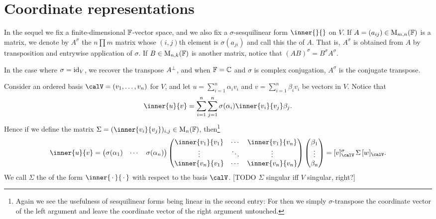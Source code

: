 \section{Coordinate representations}

In the sequel we fix a finite-dimensional $\mathbb{F}$-vector space, and we also fix a $\sigma$-sesquilinear form $\inner{}{}$ on $V$. If $A = (a_{ij}) \in \mathrm{M}_{m,n}(\mathbb{F})$ is a matrix, we denote by $A^\sigma$ the $n \prod m$ matrix whose $(i,j)$th element is $\sigma(a_{ji})$ and call this the  of $A$. That is, $A^\sigma$ is obtained from $A$ by transposition and entrywise application of $\sigma$. If $B \in \mathrm{M}_{n,k}(\mathbb{F})$ is another matrix, notice that $(AB)^\sigma = B^\sigma A^\sigma$.

In the case where $\sigma = \operatorname{id}_V$, we recover the transpose $A^\bot$, and when $\mathbb{F} = \mathbb{C}$ and $\sigma$ is complex conjugation, $A^\sigma$ is the conjugate transpose.


Consider an ordered basis $\calV = (v_1, \ldots, v_n)$ for $V$, and let $u = \sum_{i=1}^n \alpha_i v_i$ and $v = \sum_{i=1}^n \beta_i v_i$ be vectors in $V$. Notice that
%
\begin{equation*}
    \inner{u}{v}
        = \sum_{i=1}^n \sum_{j=1}^n \sigma(\alpha_i) \inner{v_i}{v_j} \beta_j.
\end{equation*}
%
Hence if we define the matrix $\Sigma = (\inner{v_i}{v_j})_{i,j} \in \mat{n}{\fieldF}$, then\footnote{Again we see the usefulness of sesquilinear forms being linear in the second entry: For then we simply $\sigma$-transpose the coordinate vector of the left argument and leave the coordinate vector of the right argument untouched.}
%
\begin{equation}
    \label{eq:sesquilinear-form}
    \inner{u}{v} =
    \begin{pmatrix}
        \sigma(\alpha_1) & \cdots & \sigma(\alpha_n)
    \end{pmatrix}
    \begin{pmatrix}
        \inner{v_1}{v_1} & \cdots & \inner{v_1}{v_n} \\
        \vdots & \ddots & \vdots \\
        \inner{v_n}{v_1} & \cdots & \inner{v_n}{v_n}
    \end{pmatrix}
    \begin{pmatrix}
        \beta_1 \\ \vdots \\ \beta_n
    \end{pmatrix}
        = \coordvec{v}{\calV}^\sigma \, \Sigma \, \coordvec{w}{\calV}.
\end{equation}
%
We call $\Sigma$ the  of the form $\inner{\,\cdot\,}{\,\cdot\,}$ with respect to the basis $\calV$. [TODO $\Sigma$ singular iff $V$ singular, right?]

